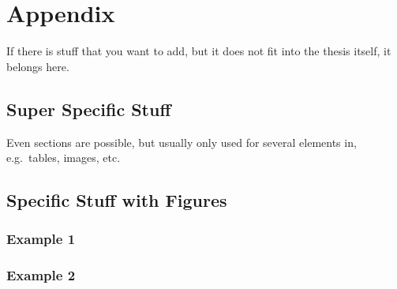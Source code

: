 \section{Appendix}

If there is stuff that you want to add, but it does not fit into the thesis itself, it belongs here.

\subsection{Super Specific Stuff}

Even sections are possible, but usually only used for several elements in, e.g.\ tables, images, etc.

\subsection{Specific Stuff with Figures}
\subsubsection{Example 1}
\subsubsection{Example 2}
